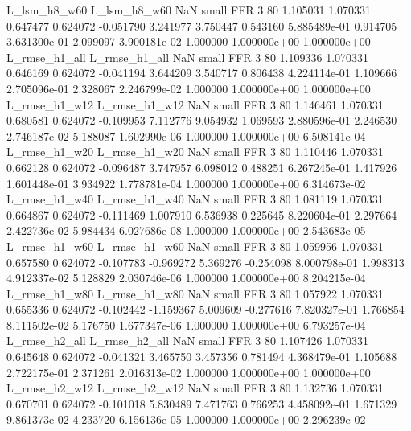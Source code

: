   L_lsm_h8_w60   L_lsm_h8_w60                   NaN      small      FFR                 3 80 1.105031       1.070331 0.647477       0.624072   -0.051790      3.241977      3.750447     0.543160   5.885489e-01  0.914705 3.631300e-01     2.099097   3.900181e-02            1.000000    1.000000e+00        1.000000e+00
 L_rmse_h1_all  L_rmse_h1_all                   NaN      small      FFR                 3 80 1.109336       1.070331 0.646169       0.624072   -0.041194      3.644209      3.540717     0.806438   4.224114e-01  1.109666 2.705096e-01     2.328067   2.246799e-02            1.000000    1.000000e+00        1.000000e+00
 L_rmse_h1_w12  L_rmse_h1_w12                   NaN      small      FFR                 3 80 1.146461       1.070331 0.680581       0.624072   -0.109953      7.112776      9.054932     1.069593   2.880596e-01  2.246530 2.746187e-02     5.188087   1.602990e-06            1.000000    1.000000e+00        6.508141e-04
 L_rmse_h1_w20  L_rmse_h1_w20                   NaN      small      FFR                 3 80 1.110446       1.070331 0.662128       0.624072   -0.096487      3.747957      6.098012     0.488251   6.267245e-01  1.417926 1.601448e-01     3.934922   1.778781e-04            1.000000    1.000000e+00        6.314673e-02
 L_rmse_h1_w40  L_rmse_h1_w40                   NaN      small      FFR                 3 80 1.081119       1.070331 0.664867       0.624072   -0.111469      1.007910      6.536938     0.225645   8.220604e-01  2.297664 2.422736e-02     5.984434   6.027686e-08            1.000000    1.000000e+00        2.543683e-05
 L_rmse_h1_w60  L_rmse_h1_w60                   NaN      small      FFR                 3 80 1.059956       1.070331 0.657580       0.624072   -0.107783     -0.969272      5.369276    -0.254098   8.000798e-01  1.998313 4.912337e-02     5.128829   2.030746e-06            1.000000    1.000000e+00        8.204215e-04
 L_rmse_h1_w80  L_rmse_h1_w80                   NaN      small      FFR                 3 80 1.057922       1.070331 0.655336       0.624072   -0.102442     -1.159367      5.009609    -0.277616   7.820327e-01  1.766854 8.111502e-02     5.176750   1.677347e-06            1.000000    1.000000e+00        6.793257e-04
 L_rmse_h2_all  L_rmse_h2_all                   NaN      small      FFR                 3 80 1.107426       1.070331 0.645648       0.624072   -0.041321      3.465750      3.457356     0.781494   4.368479e-01  1.105688 2.722175e-01     2.371261   2.016313e-02            1.000000    1.000000e+00        1.000000e+00
 L_rmse_h2_w12  L_rmse_h2_w12                   NaN      small      FFR                 3 80 1.132736       1.070331 0.670701       0.624072   -0.101018      5.830489      7.471763     0.766253   4.458092e-01  1.671329 9.861373e-02     4.233720   6.156136e-05            1.000000    1.000000e+00        2.296239e-02
